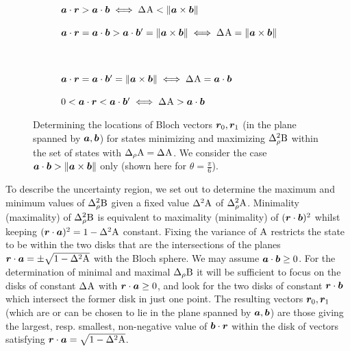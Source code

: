 \begin{figure}[h]
  \centering
  \begin{subfigure}{0.45\textwidth}
    \caption{$\boa\cdot\bor > \boa\cdot\bob \iff \sdev{\opa} < \|\boa\times\bob\|$}
  \end{subfigure}\hfill
  \begin{subfigure}{0.45\textwidth}
    \caption{$\boa\cdot\bor = \boa\cdot\bob > \boa\cdot\bob^\prime = \|\boa\times\bob\| \iff \sdev{\opa} = \|\boa\times\bob\|$}
  \end{subfigure}\\
  \begin{subfigure}{0.45\textwidth}
    \caption{$\boa\cdot\bor = \boa\cdot\bob^\prime = \|\boa\times\bob\| \iff \sdev{\opa} =\boa\cdot\bob$}
  \end{subfigure}\hfill
  \begin{subfigure}{0.45\textwidth}
    \caption{$0 < \boa\cdot\bor < \boa\cdot\bob^\prime \iff \sdev{\opa} > \boa\cdot\bob$}
  \end{subfigure}
  \caption[The Bloch vectors of the states minimizing and maximizing $\varr{\opb}$ given $\sdevr{\opa}=\sdev{\opa}$]{Determining the locations of Bloch vectors $\bm{r}_0,\bm{r}_1$ (in the plane spanned by $\bm{a},\bm{b}$) for states minimizing and maximizing $\varr{\opb}$ within the set of states with $\sdevr{\opa}=\sdev{\opa}$. We consider the case $\bm{a}\cdot\bm{b} > \|\bm{a}\times\bm{b}\|$ only (shown here for $\theta = \frac{\pi}{6}$). }\label{fig:min-max}
\end{figure}


To describe the uncertainty region, we set out to determine the maximum and minimum values of $\varr{\opb}$ given a fixed value $\var{\opa}$ of $\varr{\opa}$.
Minimality (maximality) of $\varr{\opb}$  is equivalent to maximality (minimality) of $(\bm{r}\cdot\bm{b})^2$ whilst keeping $(\bor\cdot\boa)^2=1-\var{\opa}$ constant. Fixing the variance of $\operatorname{A}$ restricts the state to be within the two disks that are the intersections of the planes $\bor\cdot\boa=\pm\sqrt{1-\var{\opa}}$ with the Bloch sphere. We may assume $\bm{a}\cdot\bm{b}\ge0$. For the determination of minimal and maximal $\sdevr{\opb}$  it will be sufficient to focus on the disks of constant $\sdev{\opa}$ with $\bm{r}\cdot\bm{a}\ge0$, and look for the two disks of constant  $\bm{r}\cdot\bm{b}$ which intersect the former disk in just one point. The resulting vectors $\bm{r}_0,\bm{r}_1$ (which are or can be chosen to lie in the plane spanned by $\bm{a},\bm{b}$) are those giving the largest, resp. smallest, non-negative value of $\bm{b}\cdot\bm{r}$ within the disk of vectors satisfying $\bor\cdot\boa=\sqrt{1-\var{\opa}}$.

